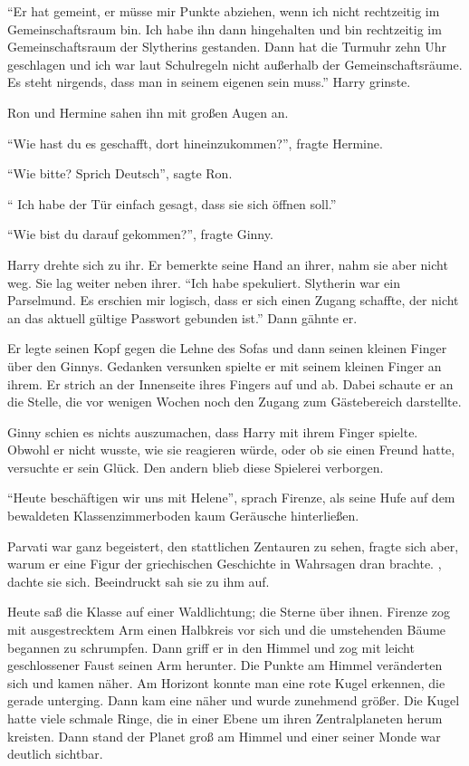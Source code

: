 \enquote{Er hat gemeint, er müsse mir Punkte abziehen, wenn ich nicht rechtzeitig im Gemeinschaftsraum bin. Ich habe ihn dann hingehalten und bin rechtzeitig im Gemeinschaftsraum der Slytherins gestanden. Dann hat die Turmuhr zehn Uhr geschlagen und ich war laut Schulregeln nicht außerhalb der Gemeinschaftsräume. Es steht nirgends, dass man in seinem eigenen sein muss.} Harry grinste.

Ron und Hermine sahen ihn mit großen Augen an.

\enquote{Wie hast du es geschafft, dort hineinzukommen?}, fragte Hermine.


\enquote{Wie bitte? Sprich Deutsch}, sagte Ron.

\enquote{ Ich habe der Tür einfach gesagt, dass sie sich öffnen soll.}

\enquote{Wie bist du darauf gekommen?}, fragte Ginny.

Harry drehte sich zu ihr. Er bemerkte seine Hand an ihrer, nahm sie aber nicht weg. Sie lag weiter neben ihrer. \enquote{Ich habe spekuliert. Slytherin war ein Parselmund. Es erschien mir logisch, dass er sich einen Zugang schaffte, der nicht an das aktuell gültige Passwort gebunden ist.} Dann gähnte er.

Er legte seinen Kopf gegen die Lehne des Sofas und dann seinen kleinen Finger über den Ginnys. Gedanken versunken spielte er mit seinem kleinen Finger an ihrem. Er strich an der Innenseite ihres Fingers auf und ab. Dabei schaute er an die Stelle, die vor wenigen Wochen noch den Zugang zum Gästebereich darstellte.

Ginny schien es nichts auszumachen, dass Harry mit ihrem Finger spielte. Obwohl er nicht wusste, wie sie reagieren würde, oder ob sie einen Freund hatte, versuchte er sein Glück. Den andern blieb diese Spielerei verborgen.

\trenn

\enquote{Heute beschäftigen wir uns mit Helene}, sprach Firenze, als seine Hufe auf dem bewaldeten Klassenzimmerboden kaum Geräusche hinterließen.

Parvati war ganz begeistert, den stattlichen Zentauren zu sehen, fragte sich aber, warum er eine Figur der griechischen Geschichte in Wahrsagen dran brachte. , dachte sie sich. Beeindruckt sah sie zu ihm auf.

Heute saß die Klasse auf einer Waldlichtung; die Sterne über ihnen. Firenze zog mit ausgestrecktem Arm einen Halbkreis vor sich und die umstehenden Bäume begannen zu schrumpfen. Dann griff er in den Himmel und zog mit leicht geschlossener Faust seinen Arm herunter. Die Punkte am Himmel veränderten sich und kamen näher. Am Horizont konnte man eine rote Kugel erkennen, die gerade unterging. Dann kam eine näher und wurde zunehmend größer. Die Kugel hatte viele schmale Ringe, die in einer Ebene um ihren Zentralplaneten herum kreisten. Dann stand der Planet groß am Himmel und einer seiner Monde war deutlich sichtbar.

